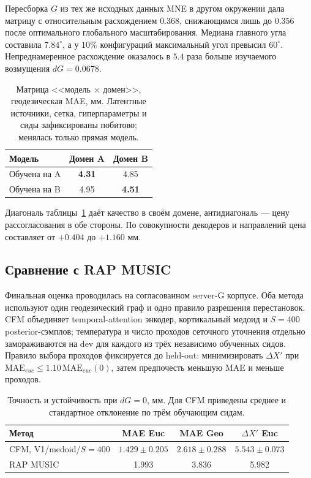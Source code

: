 Пересборка $G$ из тех же исходных данных MNE в другом окружении дала матрицу с относительным расхождением $0.368$, снижающимся лишь до $0.356$ после оптимального глобального масштабирования. Медиана главного угла составила $7.84^\circ$, а у $10\%$ конфигураций максимальный угол превысил $60^\circ$. Непреднамеренное расхождение оказалось в $5.4$ раза больше изучаемого возмущения $dG=0.0678$.

\begin{table}[t]
\centering
\caption{Матрица <<модель $\times$ домен>>, геодезическая MAE, мм. Латентные источники, сетка, гиперпараметры и сиды зафиксированы побитово; менялась только прямая модель.}
\label{tab:domain}
\begin{tabular}{lcc}
\hline
Модель & Домен A & Домен B \\
\hline
Обучена на A & \textbf{4.31} & 4.85 \\
Обучена на B & 4.95 & \textbf{4.51} \\
\hline
\end{tabular}
\end{table}

Диагональ таблицы~\ref{tab:domain} даёт качество в своём домене, антидиагональ --- цену рассогласования в обе стороны. По совокупности декодеров и направлений цена составляет от $+0.404$ до $+1.160$ мм.

\subsection{Сравнение с RAP MUSIC}

Финальная оценка проводилась на согласованном server-G корпусе. Оба метода используют один геодезический граф и одно правило разрешения перестановок. CFM объединяет temporal-attention энкодер, кортикальный медоид и $S=400$ posterior-сэмплов; температура и число проходов сеточного уточнения отдельно замораживаются на dev для каждого из трёх независимо обученных сидов. Правило выбора проходов фиксируется до held-out: минимизировать $\Delta X'$ при $\mathrm{MAE}_{euc}\leq1.10\,\mathrm{MAE}_{euc}(0)$, затем предпочесть меньшую MAE и меньше проходов.

\begin{table}[t]
\centering
\caption{Точность и устойчивость при $dG=0$, мм. Для CFM приведены среднее и стандартное отклонение по трём обучающим сидам.}
\label{tab:main}
\begin{tabular}{lccc}
\hline
Метод & MAE Euc & MAE Geo & $\Delta X'$ Euc \\
\hline
CFM, V1/medoid/$S=400$ & $\mathbf{1.429\pm0.205}$ & $\mathbf{2.618\pm0.288}$ & $5.543\pm0.073$ \\
RAP MUSIC & 1.993 & 3.836 & 5.982 \\
\hline
\end{tabular}
\end{table}

